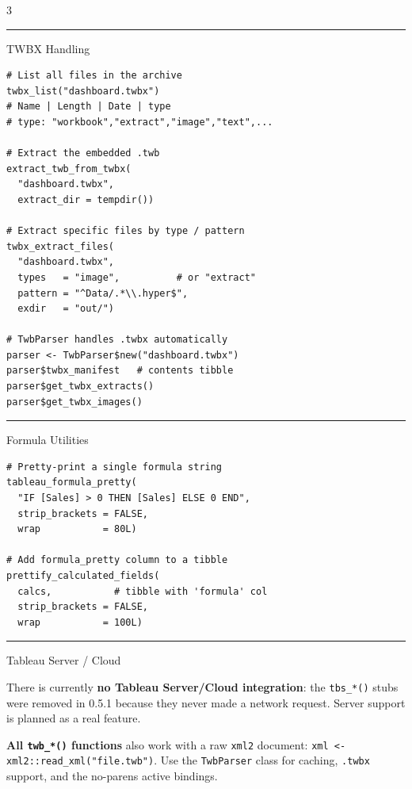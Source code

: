 \documentclass[10pt,landscape]{article}
\newcommand{\sep}{\vspace{1pt}\hrule\vspace{2pt}}
\begin{document}
\begin{multicols}{3}
\sep

\begin{secbox}[twbBlue]{TWBX Handling}
\end{secbox}

\begin{lstlisting}
# List all files in the archive
twbx_list("dashboard.twbx")
# Name | Length | Date | type
# type: "workbook","extract","image","text",...

# Extract the embedded .twb
extract_twb_from_twbx(
  "dashboard.twbx",
  extract_dir = tempdir())

# Extract specific files by type / pattern
twbx_extract_files(
  "dashboard.twbx",
  types   = "image",          # or "extract"
  pattern = "^Data/.*\\.hyper$",
  exdir   = "out/")

# TwbParser handles .twbx automatically
parser <- TwbParser$new("dashboard.twbx")
parser$twbx_manifest   # contents tibble
parser$get_twbx_extracts()
parser$get_twbx_images()
\end{lstlisting}

\sep

\begin{secbox}[twbMid]{Formula Utilities}
\end{secbox}

\begin{lstlisting}
# Pretty-print a single formula string
tableau_formula_pretty(
  "IF [Sales] > 0 THEN [Sales] ELSE 0 END",
  strip_brackets = FALSE,
  wrap           = 80L)

# Add formula_pretty column to a tibble
prettify_calculated_fields(
  calcs,           # tibble with 'formula' col
  strip_brackets = FALSE,
  wrap           = 100L)
\end{lstlisting}

\sep

\begin{secbox}[twbGray]{Tableau Server / Cloud}
\end{secbox}

\begin{tipbox}
There is currently \textbf{no Tableau Server/Cloud integration}: the
\texttt{tbs\_*()} stubs were removed in 0.5.1 because they never made a
network request. Server support is planned as a real feature.

\textbf{All \texttt{twb\_*()} functions} also work with a raw
\texttt{xml2} document: \texttt{xml <- xml2::read\_xml("file.twb")}.
Use the \texttt{TwbParser} class for caching, \texttt{.twbx} support,
and the no-parens active bindings.
\end{tipbox}

\end{multicols}
\end{document}
